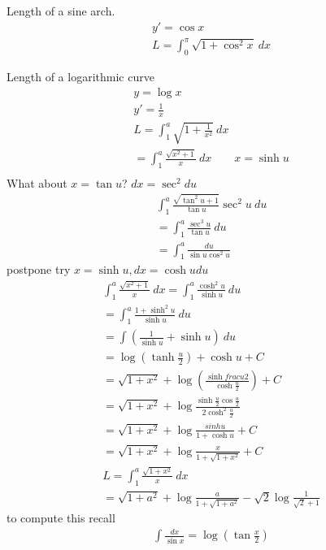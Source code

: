 \begin{nex}
	\item
	Length of a sine arch.
	\begin{align*}
	y' = \cos x \\
	L = \int_0^\pi \sqrt{1+\cos^2 x} ~ dx
	\end{align*}
	\item
	Length of a logarithmic curve
	\begin{align*}
	y = \log x \\
	y' = \frac 1 x \\
	L = \int_1^a \sqrt{1+\frac 1 {x^2}} ~dx \\
	= \int_1^a \frac{\sqrt{x^2+1}}{x} ~dx \qquad x = \sinh u \\
	\end{align*}
	What about $x=\tan u$? $dx = \sec^2 du$
	\begin{align*}
	\int_1^a \frac{\sqrt{\tan^2 u +1}}{\tan u} \sec^2 u ~du \\
	= \int_1^a \frac{\sec^3 u}{\tan u }~du \\
	= \int_1^a \frac{du}{\sin u \cos^2u}
	\end{align*}
	postpone
	try $x = \sinh u, dx = \cosh u du$
	\begin{align*} 
	\int_1^a \frac{\sqrt{x^2+1}}{x} ~dx= \int_1^a \frac{\cosh^2 u}{\sinh u} ~du \\
	= \int_1^a \frac{1+\sinh^2 u}{\sinh u} ~du \\
	= \int \left(\frac 1 {\sinh u} + \sinh u\right) ~du \\
	= \log\left( \tanh \frac u 2 \right) + \cosh u + C \\
	= \sqrt{1+x^2} + \log\left( \frac{\sinh {frac u 2}}{\cosh \frac u 2} \right) +C \\
	= \sqrt{1+x^2} + \log \frac{\sinh\frac u 2\cos\frac u 2}{2\cosh^2\frac u 2} \\
	= \sqrt{1+x^2} + \log \frac{sinh u}{1+\cosh u} +C \\
	= \sqrt{1+x^2} + \log \frac x {1+\sqrt{1+x^2}} +C \\
	L = \int_1^a \frac{\sqrt{1+x^2}} x~dx \\
		= \sqrt{1+a^2} + \log\frac a {1+\sqrt{1+a^2}} -\sqrt 2 \log \frac 1 {\sqrt 2 +1} 
		\end{align*}
	to compute this recall
	\begin{align*}
	\int \frac {dx}{\sin x} = \log \left(\tan \frac x 2 \right)
	\end{align*}
\end{nex}

